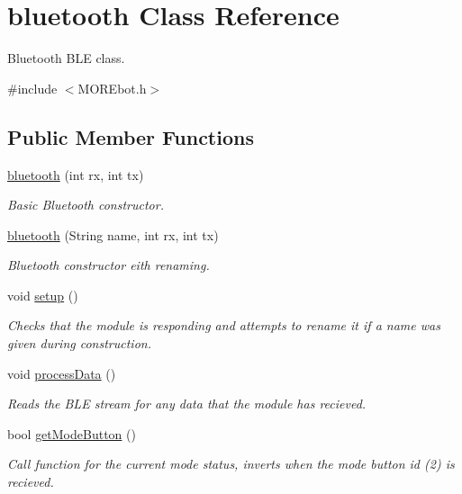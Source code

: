 \hypertarget{classbluetooth}{}\section{bluetooth Class Reference}
\label{classbluetooth}


Bluetooth B\+LE class.  




{\ttfamily \#include $<$M\+O\+R\+Ebot.\+h$>$}

\subsection*{Public Member Functions}
\begin{DoxyCompactItemize}
\item 
\mbox{\hyperlink{classbluetooth_a1e195afaeb92d85b4145e93fcc3ea376}{bluetooth}} (int rx, int tx)
\begin{DoxyCompactList}\small\item\em Basic Bluetooth constructor. \end{DoxyCompactList}\item 
\mbox{\hyperlink{classbluetooth_a552e2e5fe456775e4cbec655a5b26911}{bluetooth}} (String name, int rx, int tx)
\begin{DoxyCompactList}\small\item\em Bluetooth constructor eith renaming. \end{DoxyCompactList}\item 
void \mbox{\hyperlink{classbluetooth_a6859be315ee89d5130e198672fab774e}{setup}} ()
\begin{DoxyCompactList}\small\item\em Checks that the module is responding and attempts to rename it if a name was given during construction. \end{DoxyCompactList}\item 
void \mbox{\hyperlink{classbluetooth_abd10334bfe1bfe17de207578a2297654}{process\+Data}} ()
\begin{DoxyCompactList}\small\item\em Reads the B\+LE stream for any data that the module has recieved. \end{DoxyCompactList}\item 
bool \mbox{\hyperlink{classbluetooth_a3f58d644d4b2c7a4ac07e8e0ec5c2f9d}{get\+Mode\+Button}} ()
\begin{DoxyCompactList}\small\item\em Call function for the current mode status, inverts when the mode button id (2) is recieved. \end{DoxyCompactList}\item 

\end{DoxyCompactItemize}
